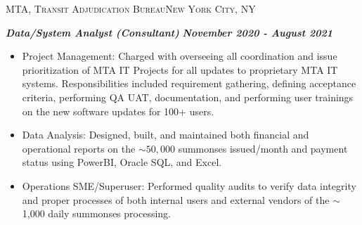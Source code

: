 \documentclass[a4paper]{article}
\newcommand{\jobtitle} [1] {
    {\hspace*{-18pt} \textsc{#1}}
    
}
\begin{document}
\jobtitle{MTA, Transit Adjudication Bureau\hfill New York City, NY}
\hspace*{-16pt}\textit{\textbf{Data/System Analyst (Consultant)}} \hfill \textit{\textbf{November 2020 - August 2021}}\\
\vspace{-1mm}
\begin{itemize}[leftmargin=10pt,align=left] \itemsep 1pt
    \item Project Management: Charged with overseeing all coordination and issue prioritization of MTA IT Projects for all updates to proprietary MTA IT systems.
            Responsibilities included requirement gathering, defining acceptance criteria, performing QA UAT, documentation, and performing user trainings on the new software updates for 100+ users.
	\item Data Analysis: Designed, built, and maintained both financial and operational reports on the $\sim50,000$ summonses issued/month and payment status using PowerBI, Oracle SQL, and Excel.
    \item Operations SME/Superuser: Performed quality audits to verify data integrity and proper processes of both internal users and external vendors of the $\sim$1,000 daily summonses processing.
\end{itemize}
\end{document}
